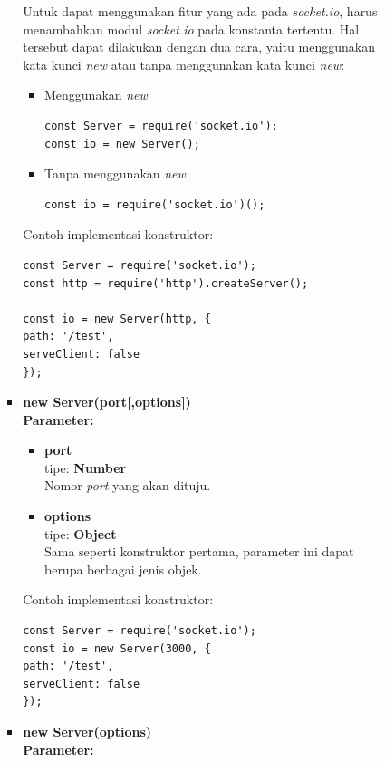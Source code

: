 \documentclass[a4paper,twoside]{article}
\begin{document}
\begin{enumerate}
\begin{enumerate}
\begin{enumerate}
\begin{itemize}
					Untuk dapat menggunakan fitur yang ada pada \textit{socket.io}, harus menambahkan modul \textit{socket.io} pada konstanta tertentu. Hal tersebut dapat dilakukan dengan dua cara, yaitu menggunakan kata kunci \textit{new} atau tanpa menggunakan kata kunci \textit{new}:
					
					\begin{itemize}
						\item Menggunakan \textit{new}
\begin{lstlisting}
const Server = require('socket.io');
const io = new Server();
\end{lstlisting}
						
						\item Tanpa menggunakan \textit{new}
\begin{lstlisting}
const io = require('socket.io')();
\end{lstlisting}
					\end{itemize}
					
					Contoh implementasi konstruktor:
					
\begin{lstlisting}
const Server = require('socket.io');
const http = require('http').createServer();
					
const io = new Server(http, {
path: '/test',
serveClient: false
});
\end{lstlisting}
					
					\item \textbf{new Server(port[,options])} \\
					\textbf{Parameter:}
					\begin{itemize}
						\item \textbf{port} \\ tipe: \textbf{Number} \\ Nomor \textit{port} yang akan dituju.
						\item \textbf{options} \\ tipe: \textbf{Object} \\ Sama seperti konstruktor pertama, parameter ini dapat berupa berbagai jenis objek.
					\end{itemize}
					
					Contoh implementasi konstruktor: 
\begin{lstlisting}
const Server = require('socket.io');
const io = new Server(3000, {
path: '/test',
serveClient: false
});
\end{lstlisting}
					
					\item \textbf{new Server(options)} \\ 
					\textbf{Parameter:}
					

\end{itemize}
\end{enumerate}
\end{enumerate}
\end{enumerate}
\end{document}
